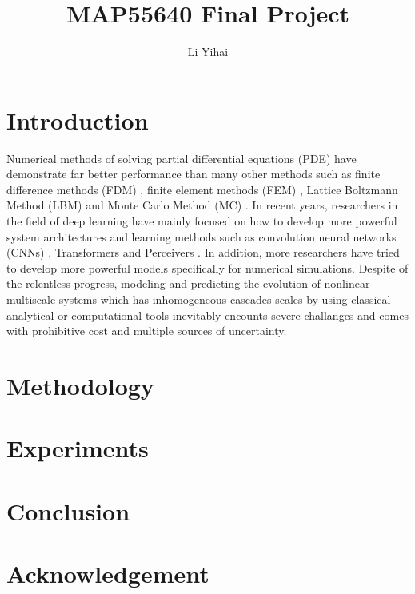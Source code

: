 \documentclass[sigconf, screen, final, language=english, natbib=false]{acmart}
\begin{document}
\title{MAP55640 Final Project}
\author{Li Yihai}



\begin{abstract}
\end{abstract}
    

\maketitle

\section{Introduction}
Numerical methods of solving partial differential equations (PDE) have 
demonstrate far better performance than many other methods such as finite 
difference methods (FDM) \cite{},
finite element methods (FEM) \cite{}, 
Lattice Boltzmann Method (LBM) \cite{}
and Monte Carlo Method (MC) \cite{}.
In recent years, researchers in the field of deep learning have mainly focused 
on how to develop more powerful system architectures and learning methods such 
as convolution neural networks (CNNs) \cite{}, 
Transformers \cite{} 
and Perceivers \cite{} .
In addition, more researchers have tried to develop more powerful models specifically 
for numerical simulations. 
Despite of the relentless progress, modeling and predicting the evolution of nonlinear 
multiscale systems which has inhomogeneous cascades-scales by using classical analytical 
or computational tools inevitably encounts severe challanges and comes with prohibitive
cost and multiple sources of uncertainty.



\section{Methodology}
\section{Experiments}
\section{Conclusion}
\section{Acknowledgement}



% 
% 

\printbibliography

\appendix
\end{document}
